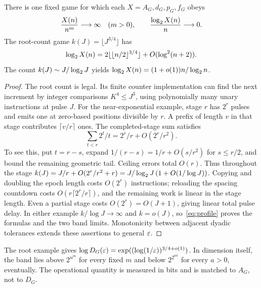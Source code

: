 \begin{corollary}\label{cor:band}
There is one fixed game for which each $X=A_G,d_G,p_G,f_G$ obeys
\[
 \frac{X(n)}{n^m}\longrightarrow\infty\quad(m>0),\qquad
 \frac{\log_2 X(n)}n\longrightarrow0.
\]
The root-count game $k(J)=\lfloor J^{3/4}\rfloor$ has
\[
 \log_2 X(n)=2\lfloor\lfloor n/2\rfloor^{3/4}\rfloor+O(\log^2(n+2)).
\]
The count $k(J)\sim J/\log_2 J$ yields $\log_2 X(n)=(1+o(1))n/\log_2 n$.
\end{corollary}
\begin{proof}
The root count is legal. Its finite counter implementation can find the next increment by integer comparisons $K^4\le J^3$, using polynomially many unary instructions at pulse $J$. For the near-exponential example, stage $r$ has $2^r$ pulses and emits one at zero-based positions divisible by $r$. A prefix of length $v$ in that stage contributes $\lceil v/r\rceil$ ones. The completed-stage sum satisfies
\[
 \sum_{t<r}2^t/t=2^r/r+O(2^r/r^2).
\]
To see this, put $t=r-s$, expand $1/(r-s)=1/r+O(s/r^2)$ for $s\le r/2$, and bound the remaining geometric tail. Ceiling errors total $O(r)$. Thus throughout the stage $k(J)=J/r+O(2^r/r^2+r)=J/\log_2 J\,(1+O(1/\log J))$. Copying and doubling the epoch length costs $O(2^r)$ instructions; reloading the spacing countdown costs $O(r\lceil2^r/r\rceil)$, and the remaining work is linear in the stage length. Even a partial stage costs $O(2^r)=O(J+1)$, giving linear total pulse delay. In either example $k/\log J\to\infty$ and $k=o(J)$, so~\eqref{eq:profile} proves the formulas and the two band limits. Monotonicity between adjacent dyadic tolerances extends these assertions to general $\varepsilon$.
\end{proof}

The root example gives $\log D_G(\varepsilon)=\exp((\log(1/\varepsilon))^{3/4+o(1)})$. In dimension itself, the band lies above $2^{n^m}$ for every fixed $m$ and below $2^{2^{an}}$ for every $a>0$, eventually. The operational quantity is measured in bits and is matched to $A_G$, not to $D_G$.
